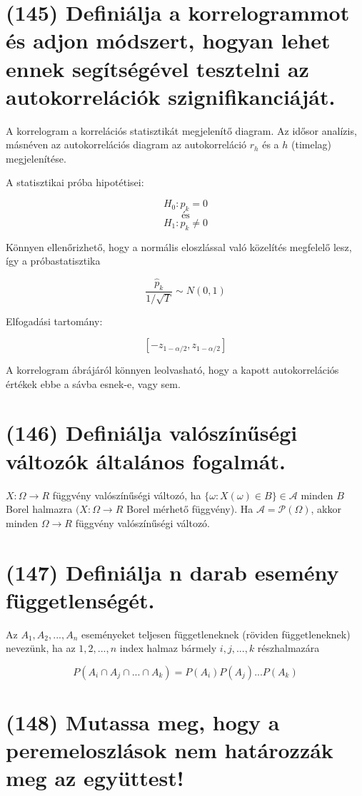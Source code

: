 \documentclass[12p]{article}
\begin{document}
\section{(145) Definiálja a korrelogrammot és adjon módszert, hogyan lehet ennek segítségével tesztelni
az autokorrelációk szignifikanciáját.}

A korrelogram a korrelációs statisztikát megjelenítő diagram. Az idősor analízis, másnéven az autokorrelációs diagram az autokorreláció $r_h$ és a $h$ (timelag) megjelenítése.

A statisztikai próba hipotétisei:

$$H_0 : p_k = 0$$
\[
	\text{és}
\]
$$H_1 : p_k \neq 0$$

Könnyen ellenőrizhető, hogy a normális eloszlással való közelítés megfelelő
lesz, így a próbastatisztika

$$\frac{\hat{p}_k}{1/\sqrt{T}} \sim N(0,1) $$

Elfogadási tartomány:

$$[-z_{1-\alpha/2},z_{1-\alpha/2}]$$

A korrelogram ábrájáról könnyen leolvasható, hogy a kapott autokorrelációs
értékek ebbe a sávba esnek-e, vagy sem.

\section{(146) Definiálja valószínűségi változók általános fogalmát.}

$X : \Omega \rightarrow R$ függvény valószínűségi változó, ha $\{\omega: X(\omega) \in B\} \in \mathscr{A}$ minden $B$ Borel halmazra $(X: \Omega \rightarrow R$ Borel mérhető függvény).
Ha $\mathscr{A} = \mathscr{P}(\Omega)$, akkor minden $\Omega \rightarrow R$ függvény valószínűségi változó.


\section{(147) Definiálja n darab esemény függetlenségét.}

Az $A_1,A_2, ..., A_n$ eseményeket teljesen függetleneknek (röviden függetleneknek) nevezünk, ha az ${1, 2, ..., n}$ index halmaz bármely ${i, j, ..., k}$ részhalmazára

$$P(A_i \cap A_j \cap ... \cap A_k) = P(A_i)P(A_j)...P(A_k)$$

\section{(148) Mutassa meg, hogy a peremeloszlások nem határozzák meg az együttest!}
\end{document}
